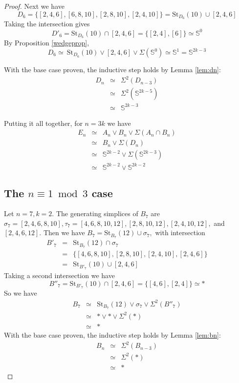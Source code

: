 \documentclass{amsart}
\theoremstyle{definition}
\newcommand{\zs}{{\mathbb S}}
\begin{document}
\begin{proof}
Next we have $$D_6=\{[2,4,6],[6,8,10],[2,8,10],[2,4,10]\}=\text{St}_{D_6}(10)\cup[2,4,6]$$ Taking the intersection gives
$$D'_6=\text{St}_{D_6}(10)\cap[2,4,6]=\{[2,4],[6]\}\simeq\zs^0$$
By Proposition \ref{wedgeprop}, $$D_6\simeq~\text{St}_{D_6}(10)\vee[2,4,6]\vee\Sigma(\zs^0)\simeq\zs^1=\zs^{2k-3}$$

With the base case proven, the inductive step holds by Lemma \ref{lem:dn}:
    \begin{eqnarray*}
        D_n &\simeq &\Sigma^2(D_{n-3})\\
        &\simeq &\Sigma^2(\zs^{2k-5})\\
        &\simeq &\zs^{2k-3}
    \end{eqnarray*}

Putting it all together, for $n=3k$ we have 
\begin{eqnarray*}
    E_n &\simeq & A_n\vee B_n\vee\Sigma(A_n\cap B_n)\\
    &\simeq & B_n\vee\Sigma(D_n)\\
    &\simeq &\zs^{2k-2}\vee\Sigma(\zs^{2k-3})\\
    &\simeq &\zs^{2k-2}\vee\zs^{2k-2}
\end{eqnarray*}

\subsection*{The $n\equiv 1\bmod 3$ case} Let $n=7,k=2$. The generating simplices of $B_7$ are $\sigma_7=[2,4,6,8,10],\tau_7=[4,6,8,10,12],[2,8,10,12],[2,4,10,12],$ and $[2,4,6,12]$. Then we have $B_7=\text{St}_{B_7}(12)\cup\sigma_7,$  with intersection
    \begin{eqnarray*}
        B'_7 &= &\text{St}_{B_7}(12)\cap\sigma_7 \\
        & = &\{[4,6,8,10],[2,8,10],[2,4,10],[2,4,6]\}\\
        &= &\text{St}_{B'_7}(10)\cup [2,4,6]
    \end{eqnarray*}
Taking a second intersection we have 
    $$B''_7=\text{St}_{B'_7}(10)\cap [2,4,6]=\{[4,6],[2,4]\}\simeq*$$
So we have
    \begin{eqnarray*}
    B_7&\simeq &\text{St}_{B_7}(12)\vee\sigma_7\vee\Sigma^2(B''_7)\\
    & \simeq & \ast\vee\ast\vee\Sigma^2(*)\\
    & \simeq & \ast
    \end{eqnarray*}
With the base case proven, the inductive step holds by Lemma \ref{lem:bn}:
    \begin{eqnarray*}
        B_n &\simeq &\Sigma^2(B_{n-3})\\
        &\simeq & \Sigma^2(*)\\
        &\simeq & \ast
    \end{eqnarray*}


\end{proof}
\end{document}
